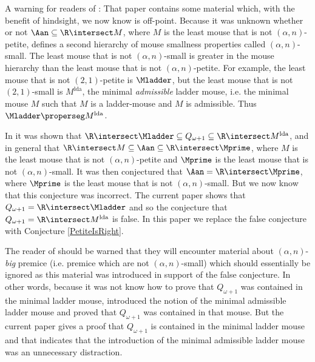 \documentclass[oneside,12pt]{amsart}
\begin{document}
A warning for readers of \cite{Mouse_Sets}: That paper contains some material which, with the benefit of hindsight,
we now know is off-point. Because it was unknown whether or not
$\Aan\subseteq \R\intersect M$, where $M$ is the least mouse that is not
$(\alpha,n)$-petite, \cite{Mouse_Sets} defines a second hierarchy of mouse
smallness properties called $(\alpha,n)$-small. The least mouse that is not
$(\alpha,n)$-small is greater in the mouse hierarchy than the least mouse that
is not $(\alpha,n)$-petite. For example, the least mouse that is not
$(2,1)$-petite is $\Mladder$, but the least mouse that is not
$(2,1)$-small is $M^{\text{lda}}$, the minimal \emph{admissible} ladder mouse,
i.e. the minimal mouse $M$ such that $M$ is a ladder-mouse and
$M$ is admissible. Thus $\Mladder\properseg M^{\text{lda}}$.

In
\cite{Mouse_Sets} it was shown that
$\R\intersect \Mladder \subseteq Q_{\omega+1}\subseteq \R\intersect M^{\text{lda}}$, and in general that $\R \intersect M \subseteq \Aan\subseteq \R\intersect\Mprime$, where $M$ is the least mouse that is not
$(\alpha,n)$-petite and $\Mprime$ is the least mouse that is not
$(\alpha,n)$-small. It was then conjectured that
$\Aan=\R\intersect \Mprime$, where $\Mprime$ is the least mouse that is not
$(\alpha,n)$-small. But we now know that this conjecture was incorrect. The
current
paper shows that $Q_{\omega+1}=\R\intersect\Mladder$ and so the conjecture
that $Q_{\omega+1}=\R\intersect M^{\text{lda}}$ is false. In this paper we
replace the false conjecture with Conjecture \ref{PetiteIsRight}.

The reader of \cite{Mouse_Sets} should be warned that they will encounter
material about $(\alpha,n)$-\emph{big} premice
(i.e. premice which are not $(\alpha,n)$-small) which should essentially
be ignored as this material was introduced in support of the false conjecture.
In other words, because it was not know how to prove that $Q_{\omega+1}$
was contained in the minimal ladder mouse, \cite{Mouse_Sets} introduced the
notion of the minimal admissible ladder mouse and proved that
$Q_{\omega+1}$ was contained in that mouse. But the current paper gives a
proof that $Q_{\omega+1}$ is contained in the minimal ladder mouse and
that indicates
that the introduction of the minimal admissible ladder mouse was an
unnecessary distraction.



\end{document}
